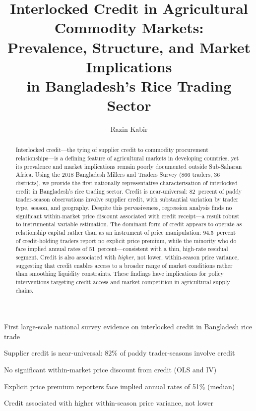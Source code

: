 \documentclass[authoryear,preprint,review,12pt]{elsarticle}
\begin{document}
\linenumbers

\begin{frontmatter}

\title{Interlocked Credit in Agricultural Commodity Markets:\\
       Prevalence, Structure, and Market Implications\\
       in Bangladesh's Rice Trading Sector}

\author[ifpri]{Razin Kabir}


\begin{abstract}
Interlocked credit---the tying of supplier credit to commodity procurement
relationships---is a defining feature of agricultural markets in developing
countries, yet its prevalence and market implications remain poorly documented
outside Sub-Saharan Africa. Using the 2018 Bangladesh Millers and Traders
Survey (866 traders, 36 districts), we provide the first nationally representative
characterisation of interlocked credit in Bangladesh's rice
trading sector. Credit is near-universal: 82~percent of paddy trader-season
observations involve supplier credit, with substantial variation by trader
type, season, and geography. Despite this pervasiveness, regression analysis
finds no significant within-market price discount associated with credit
receipt---a result robust to instrumental variable estimation. The dominant
form of credit appears to operate as relationship capital rather than as an
instrument of price manipulation: 94.5~percent of credit-holding traders
report no explicit price premium, while the minority who do face implied
annual rates of 51~percent---consistent with a thin, high-rate residual
segment. Credit is also associated with \emph{higher}, not lower,
within-season price variance, suggesting that credit enables access to
a broader range of market conditions rather than smoothing liquidity
constraints. These findings have implications for policy interventions
targeting credit access and market competition in agricultural supply chains.
\end{abstract}

\begin{highlights}
\item First large-scale national survey evidence on interlocked credit in Bangladesh rice trade
\item Supplier credit is near-universal: 82\% of paddy trader-seasons involve credit
\item No significant within-market price discount from credit (OLS and IV)
\item Explicit price premium reporters face implied annual rates of 51\% (median)
\item Credit associated with higher within-season price variance, not lower
\end{highlights}


\end{frontmatter}
\end{document}
